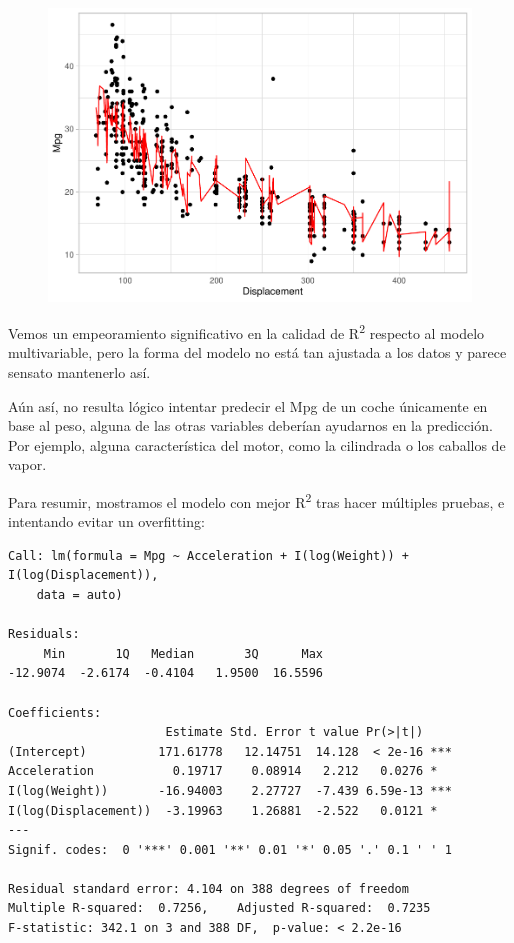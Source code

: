 \begin{figure}[H]\includegraphics[width=.9\linewidth]{img/Regresion_files/figure-latex/unnamed-chunk-24-3} \caption{}\end{figure}

Vemos un empeoramiento significativo en la calidad de R\textsuperscript{2} respecto al modelo multivariable, pero la forma del modelo no está tan ajustada a los datos y parece sensato mantenerlo así.

Aún así, no resulta lógico intentar predecir el Mpg de un coche únicamente en base al peso, alguna de las otras variables deberían ayudarnos en la predicción. Por ejemplo, alguna característica del motor, como la cilindrada o los caballos de vapor.

\vspace{\baselineskip}

Para resumir, mostramos el modelo con mejor R\textsuperscript{2} tras hacer múltiples pruebas, e intentando evitar un overfitting:
\begin{verbatim}
Call: lm(formula = Mpg ~ Acceleration + I(log(Weight)) + I(log(Displacement)), 
    data = auto)

Residuals:
     Min       1Q   Median       3Q      Max 
-12.9074  -2.6174  -0.4104   1.9500  16.5596 

Coefficients:
                      Estimate Std. Error t value Pr(>|t|)    
(Intercept)          171.61778   12.14751  14.128  < 2e-16 ***
Acceleration           0.19717    0.08914   2.212   0.0276 *  
I(log(Weight))       -16.94003    2.27727  -7.439 6.59e-13 ***
I(log(Displacement))  -3.19963    1.26881  -2.522   0.0121 *  
---
Signif. codes:  0 '***' 0.001 '**' 0.01 '*' 0.05 '.' 0.1 ' ' 1

Residual standard error: 4.104 on 388 degrees of freedom
Multiple R-squared:  0.7256,    Adjusted R-squared:  0.7235 
F-statistic: 342.1 on 3 and 388 DF,  p-value: < 2.2e-16
\end{verbatim}

